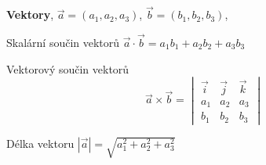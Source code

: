 \documentclass{article}
\begin{document}
\begin{multicols}{3}
\textbf{Vektory}, $\vec a=(a_1,a_2,a_3)$, $\vec b=(b_1,b_2,b_3)$, 

Skalární součin vektorů
$\vec a\cdot\vec b=a_1 b_1 + a_2 b_2+a_3b_3$

Vektorový součin vektorů
\vspace*{-8pt}
$$\vec a\times \vec b=
\begin{vmatrix}
  \vec i & \vec j & \vec k\\
  a_1 & a_2 & a_3 \\
  b_1 & b_2 & b_3
\end{vmatrix}
$$

Délka vektoru  $|\vec a|=\sqrt{a_1^2+a_2^2+a_3^2}$



\end{multicols}
\end{document}
